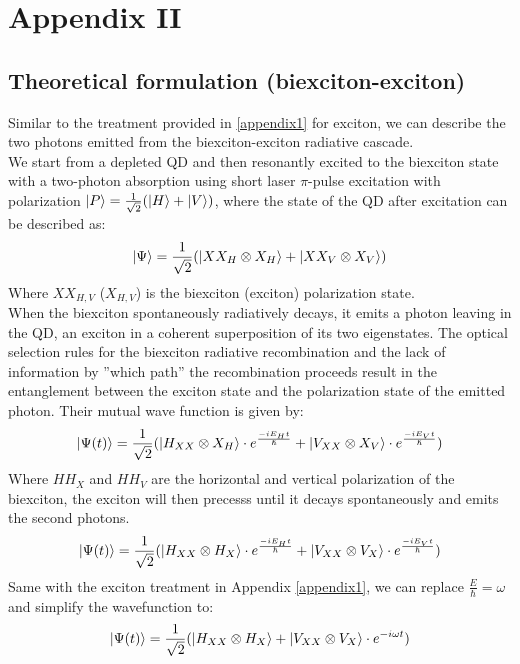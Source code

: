 \section{Appendix II} \label{appendix2}
\subsection*{Theoretical formulation (biexciton-exciton)}
Similar to the treatment provided in \ref{appendix1} for exciton, we can describe the two photons emitted from the biexciton-exciton radiative cascade.\\
We start from a depleted QD and then resonantly excited to the biexciton state with a two-photon absorption \cite{Muller2014} using short laser $\pi$-pulse excitation with polarization $\ket{P}=\frac{1}{\sqrt{2}}(\ket{H}+\ket{V})$, where the state of the QD after excitation can be described as:
\begin{equation}
	\ket{\Psi} = \frac{1}{\sqrt{2}}(\ket{XX_{H}\otimes X_H}+\ket{XX_{V}\otimes X_V})
\end{equation}
Where $XX_{H,V}$ ($X_{H,V}$) is the biexciton (exciton) polarization state.\\
When the biexciton spontaneously radiatively decays, it emits a photon leaving in the QD, an exciton in a coherent superposition of its two eigenstates. The
optical selection rules for the biexciton radiative recombination and the lack of information by ”which path” the recombination proceeds result in the entanglement between the exciton state and the polarization state of the emitted photon. Their mutual wave function is given by:
\begin{equation}
	\ket{\Psi(t)} = \frac{1}{\sqrt{2}}(\ket{H_{XX} \otimes  X_H}\cdot e^{\frac{-iE_H t}{\hslash}}+\ket{V_{XX}\otimes X_V}\cdot e^{\frac{-iE_Vt}{\hslash}})
\end{equation}
Where $HH_X$ and $HH_V$ are the horizontal and vertical polarization of the biexciton, the exciton will then precesss until it decays spontaneously and emits the second photons.
\begin{equation}
	\ket{\Psi(t)} = \frac{1}{\sqrt{2}}(\ket{H_{XX} \otimes  H_X}\cdot e^{\frac{-iE_H t}{\hslash}}+\ket{V_{XX}\otimes V_X}\cdot e^{\frac{-iE_Vt}{\hslash}})
\end{equation}
Same with the exciton treatment in Appendix \ref{appendix1}, we can replace $\frac{E}{\hslash}=\omega$ and simplify the wavefunction to:
\begin{equation}
	\ket{\Psi(t)} = \frac{1}{\sqrt{2}}(\ket{H_{XX} \otimes H_X}+\ket{V_{XX}\otimes V_X}\cdot e^{-i\omega t})
\end{equation}
